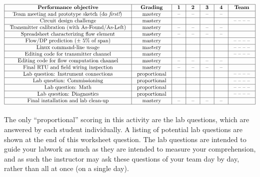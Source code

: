 $$\vbox{\offinterlineskip
\halign{\strut
\vrule \quad\hfil # \ \hfil & 
\vrule \quad\hfil # \ \hfil & 
\vrule \quad\hfil # \ \hfil & 
\vrule \quad\hfil # \ \hfil & 
\vrule \quad\hfil # \ \hfil & 
\vrule \quad\hfil # \ \hfil & 
\vrule \quad\hfil # \ \hfil \vrule \cr
\noalign{\hrule}
%
{\bf Performance objective} & {\bf Grading} & {\bf 1} & {\bf 2} & {\bf 3} & {\bf 4} & {\bf Team} \cr
%
\noalign{\hrule}
%
Team meeting and prototype sketch (do {\it first!}) & mastery & -- & -- & -- & -- & \cr
%
\noalign{\hrule}
%
Circuit design challenge & mastery & & & & & -- -- -- -- \cr
%
\noalign{\hrule}
%
Transmitter calibration (with As-Found/As-Left) & mastery & -- & -- & -- & -- &  \cr
%
\noalign{\hrule}
%
Spreadsheet characterizing flow element & mastery & -- & -- & -- & -- &  \cr
%
\noalign{\hrule}
%
Flow/DP prediction ($\pm$ 5\% of span) & mastery & & & & & -- -- -- -- \cr
%
\noalign{\hrule}
%
Linux command-line usage & mastery &  &  &  &  & -- -- -- -- \cr
%
\noalign{\hrule}
%
Editing code for transmitter channel & mastery &  &  &  &  & -- -- -- -- \cr
%
\noalign{\hrule}
%
Editing code for flow computation channel & mastery & -- & -- & -- & -- &  \cr
%
\noalign{\hrule}
%
Final RTU and field wiring inspection & mastery & -- & -- & -- & -- &  \cr
%
\noalign{\hrule}
%
%
%
Lab question: Instrument connections & proportional &  &  &  &  & -- -- -- -- \cr
%
\noalign{\hrule}
%
Lab question: Commissioning & proportional &  &  &  &  & -- -- -- -- \cr
%
\noalign{\hrule}
%
Lab question: Math & proportional &  &  &  &  & -- -- -- -- \cr
%
\noalign{\hrule}
%
Lab question: Diagnostics & proportional &  &  &  &  & -- -- -- -- \cr
%
\noalign{\hrule}
%
Final installation and lab clean-up & mastery & -- & -- & -- & -- &  \cr
%
\noalign{\hrule}
} %
}$$ %

The only ``proportional'' scoring in this activity are the lab questions, which are answered by each student individually.  A listing of potential lab questions are shown at the end of this worksheet question.  The lab questions are intended to guide your labwork as much as they are intended to measure your comprehension, and as such the instructor may ask these questions of your team day by day, rather than all at once (on a single day).


